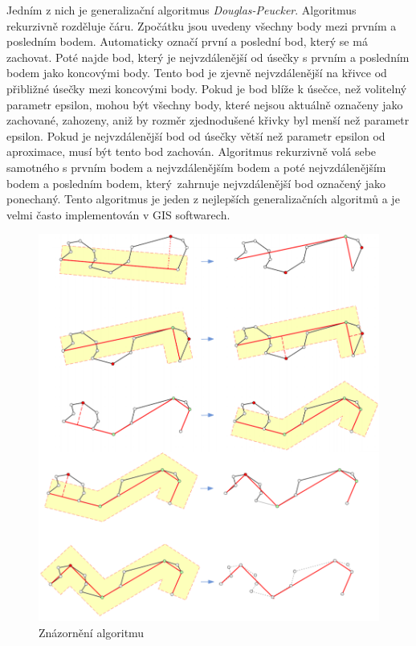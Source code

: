 Jedním z nich je generalizační algoritmus \textit{Douglas-Peucker}. Algoritmus rekurziv\-ně rozděluje čáru.
Zpočátku jsou uvedeny všechny body mezi prvním a posledním bodem. Automaticky označí první a poslední bod,
který se má zachovat. Poté najde bod, který je nejvzdálenější od úsečky s prvním a posledním bodem 
jako koncovými body. Tento bod je zjevně nejvzdálenější na křivce od přibližné úsečky mezi koncovými body. 
Pokud je bod blíže k úsečce, než volitelný parametr epsilon, mohou být všechny body, které nejsou aktuálně označeny jako zachované,
zahozeny, aniž by rozměr zjednodušené křivky byl menší než parametr epsilon. Pokud je nejvzdálenější bod od úsečky větší než parametr epsilon od aproximace,
musí být tento bod zachován. Algoritmus rekurzivně volá sebe samotného s prvním bodem a nejvzdálenějším bodem 
a poté nejvzdálenějším bodem a posledním bodem, který~zahrnuje nejvzdálenější bod označený jako ponechaný.
Tento algoritmus je jeden z nejlepších generalizačních algoritmů a je velmi často
implementován v GIS softwarech. \cite{bayer-douglas}

\begin{figure}[H] \centering
    \includegraphics[width=400pt]{./pictures/douglas.png}
    \caption[Znázornění algoritmu ]{Znázornění algoritmu  \cite{bayer-douglas}}
	\label{fig:douglas}              
\end{figure} 

